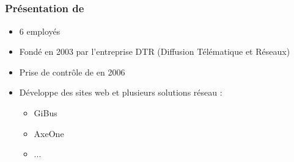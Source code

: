 \subsection{\fidit}

\begin{frame}
	\frametitle{Présentation de \fidit}

	\begin{itemize}
		\item 6 employés\sautligne

		\item Fondé en 2003 par l'entreprise DTR (Diffusion Télématique et Réseaux)
		\item Prise de contrôle de \solulog{} en 2006 \sautligne

		\item Développe des sites web et plusieurs solutions réseau :
			\begin{itemize}
				\item GiBus
				\item AxeOne
				\item ...
			\end{itemize}
	\end{itemize}
\end{frame}
